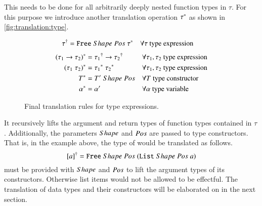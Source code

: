 This needs to be done for all arbitrarily deeply nested function types in $\tau$.
For this purpose we introduce another translation operation ${\tau}^{*}$ as shown in \autoref{fig:translation:type}.
\begin{figure}[H]
  \begin{align}
       {\tau}^{\dagger}
    &= {\texttt{Free}}\;Shape\;Pos\;{{\tau}^{*}}
    && \forall \tau \text{ type expression}
       \label{eqn:translation:type}
  \end{align}
  \begin{align}
       {(\tau_1 \rightarrow \tau_2)}^{*}
    &= {\tau_1}^{\dagger} \rightarrow {\tau_2}^{\dagger}
    && \forall \tau_1, \tau_2 \text{ type expression}
       \label{eqn:translation:type:function}
    \\
       {(\tau_1\;\tau_2)}^{*}
    &= {\tau_1}^{*}\;{\tau_2}^{*}
    && \forall \tau_1, \tau_2 \text{ type expression}
       \label{eqn:translation:type:application}
    \\
       {T}^{*}
    &= {T'}\;Shape\;Pos
    && \forall T \text{ type constructor}
       \label{eqn:translation:type:constructor}
    \\
    {\alpha}^{*}
    &= \alpha'
    && \forall \alpha \text{ type variable}
       \label{eqn:translation:type:variable}
  \end{align}
  \caption{Final translation rules for type expressions.}
  \label{fig:translation:type}
\end{figure}

It recursively lifts the argument and return types of function types contained in $\tau$.
Additionally, the parameters $Shape$ and $Pos$ are passed to type constructors.
That is, in the example above, the type of  would be translated as follows.
\[
  {[a]}^{\dagger} = {\texttt{Free}}\;Shape\;Pos\;{({\texttt{List}}\;Shape\;Pos\;a)}
\]
 must be provided with $Shape$ and $Pos$ to lift the argument types of its constructors.
Otherwise list items would not be allowed to be effectful.
The translation of data types and their constructors will be elaborated on in the next section.
